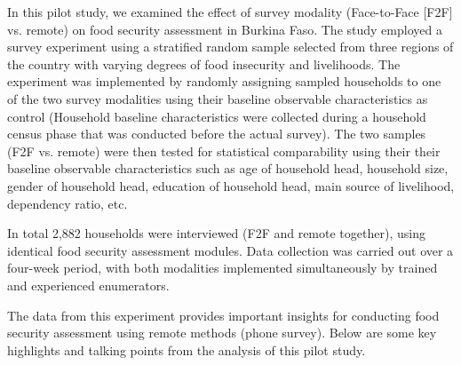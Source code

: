 \documentclass[11pt,harvard]{article}
\begin{document}
	In this pilot study, we examined the effect of survey modality (Face-to-Face [F2F] vs. remote) on food security assessment in Burkina Faso. The study employed a survey experiment using a stratified random sample selected from three regions of the country with varying degrees of food insecurity and livelihoods. The experiment was implemented by randomly assigning sampled households to one of the two survey modalities using their baseline observable characteristics as control (Household baseline characteristics were collected during a household census phase that was conducted before the actual survey). The two samples (F2F vs. remote) were then tested for statistical comparability using their their baseline observable characteristics such as age of household head, household size, gender of household head, education of household head, main source of livelihood, dependency ratio, etc.

	In total 2,882 households were interviewed (F2F and remote together), using identical food security assessment modules. Data collection was carried out over a four-week period, with both modalities implemented simultaneously by trained and experienced enumerators. 
	
	The data from this experiment provides important insights for conducting food security assessment using remote methods (phone survey). Below are some key highlights and talking points from the analysis of this pilot study.
	
\end{document}
